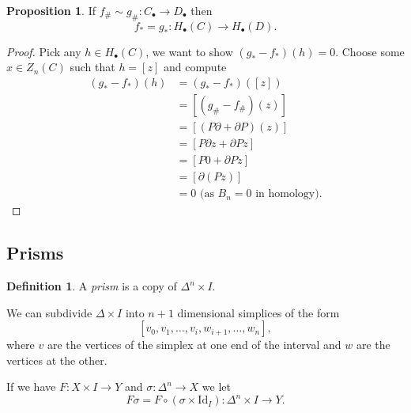 \documentclass[12pt]{article}
\theoremstyle{definition}
\newtheorem*{prop}{Proposition}
\theoremstyle{definition}
\newtheorem*{defn}{Definition}
\newcommand{\C}{C_\bullet}
\renewcommand{\H}{H_\bullet}
\begin{document}
\begin{prop}
If $f_\#\sim g_\#\colon \C \to D_\bullet$ then 
\[
f_* = g_* \colon \H(C) \to \H(D).
\]
\end{prop}
\begin{proof}
Pick any $h\in\H(C)$, we want to show $(g_* - f_*)(h) = 0$.
Choose some $x\in Z_n(C)$ such that $h = [z]$ and compute
\begin{align*}
(g_* - f_*)(h) &= (g_* - f_*)([z])\\
 &= [(g_\#- f_\#)(z)]\\
 &= [(P\partial + \partial P)(z)]\\
 &= [P\partial z + \partial Pz]\\
 &= [P0 + \partial Pz]\\
 &= [\partial(Pz)]\\
 &= 0\text{ (as }B_n = 0\text{ in homology)}.
\end{align*}
\end{proof}

\subsection{Prisms}
\begin{defn}
A \emph{prism} is a copy of $\Delta^n \times I$.
\end{defn}

We can subdivide $\Delta\times I$ into $n+1$ dimensional simplices of the form
\[
[v_0,v_1,\ldots,v_i,w_{i+1},\ldots,w_n],
\]
where $v$ are the vertices of the simplex at one end of the interval and $w$ are the vertices at the other.

If we have $F\colon X\times I \to Y$ and $\sigma\colon \Delta^n \to X$ we let
\[
F\sigma = F\circ(\sigma \times \mathrm{Id}_I)\colon \Delta^n \times I \to Y.
\]
\end{document}
